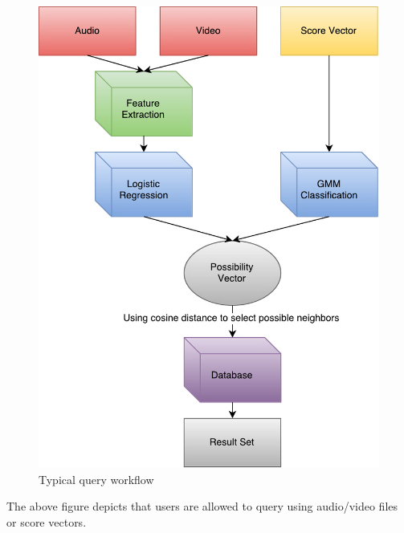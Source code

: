 \documentclass{report}
\begin{document}
\begin{figure}[H]
  \centering
  \includegraphics[scale=0.7]{vdf-query.pdf}
  \caption{Typical query workflow}
  \label{fig:qwf}
\end{figure}

The above figure depicts that users are allowed to query using audio/video files or score vectors.
\end{document}
